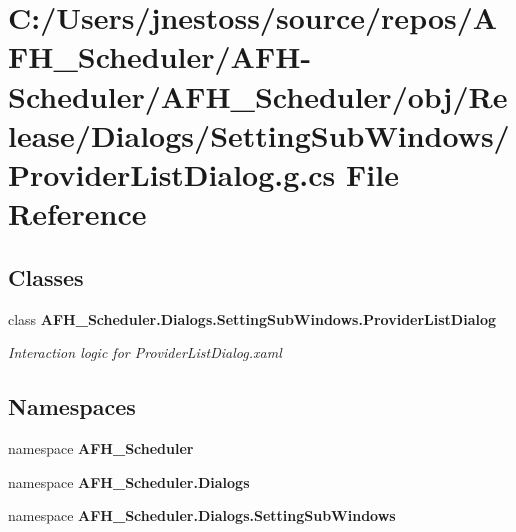 \section{C\+:/\+Users/jnestoss/source/repos/\+A\+F\+H\+\_\+\+Scheduler/\+A\+F\+H-\/\+Scheduler/\+A\+F\+H\+\_\+\+Scheduler/obj/\+Release/\+Dialogs/\+Setting\+Sub\+Windows/\+Provider\+List\+Dialog.g.\+cs File Reference}
\label{_release_2_dialogs_2_setting_sub_windows_2_provider_list_dialog_8g_8cs}
\subsection*{Classes}
\begin{DoxyCompactItemize}
\item 
class \textbf{ A\+F\+H\+\_\+\+Scheduler.\+Dialogs.\+Setting\+Sub\+Windows.\+Provider\+List\+Dialog}
\begin{DoxyCompactList}\small\item\em Interaction logic for Provider\+List\+Dialog.\+xaml \end{DoxyCompactList}\end{DoxyCompactItemize}
\subsection*{Namespaces}
\begin{DoxyCompactItemize}
\item 
namespace \textbf{ A\+F\+H\+\_\+\+Scheduler}
\item 
namespace \textbf{ A\+F\+H\+\_\+\+Scheduler.\+Dialogs}
\item 
namespace \textbf{ A\+F\+H\+\_\+\+Scheduler.\+Dialogs.\+Setting\+Sub\+Windows}
\end{DoxyCompactItemize}
